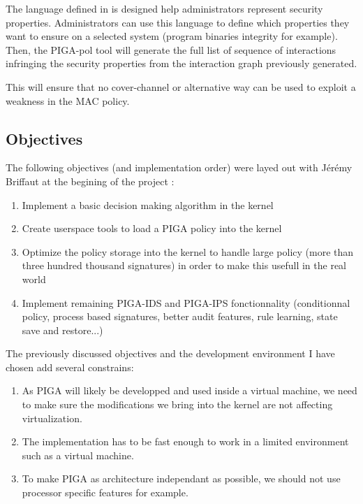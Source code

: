 \documentclass[pdftex,a4paper,titlepage,11pt]{article}
\begin{document}
\bigskip

The language defined in \cite{THESEBRIFFAUT} is designed help administrators represent security properties. Administrators can use this language to define which properties they want to ensure on a selected system (program binaries integrity for example). Then, the PIGA-pol tool will generate the full list of sequence of interactions infringing the security properties from the interaction graph previously generated.

\bigskip

This will ensure that no cover-channel or alternative way can be used to exploit a weakness in the MAC policy.

\subsection{Objectives}

The following objectives (and implementation order) were layed out with Jérémy Briffaut at the begining of the project :

\begin{enumerate}
	\item Implement a basic decision making algorithm in the kernel
	\item Create userspace tools to load a PIGA policy into the kernel
	\item Optimize the policy storage into the kernel to handle large policy (more than three hundred thousand signatures) in order to make this usefull in the real world
	\item Implement remaining PIGA-IDS and PIGA-IPS fonctionnality (conditionnal policy, process based signatures, better audit features, rule learning, state save and restore...)
\end{enumerate}

\smallskip

The previously discussed objectives and the development environment I have chosen add several constrains:

\begin{enumerate}
	\item As PIGA will likely be developped and used inside a virtual machine, we need to make sure the modifications we bring into the kernel are not affecting virtualization.
	\item The implementation has to be fast enough to work in a limited environment such as a virtual machine.
	\item To make PIGA as architecture independant as possible, we should not use processor specific features for example.
\end{enumerate}
\end{document}
